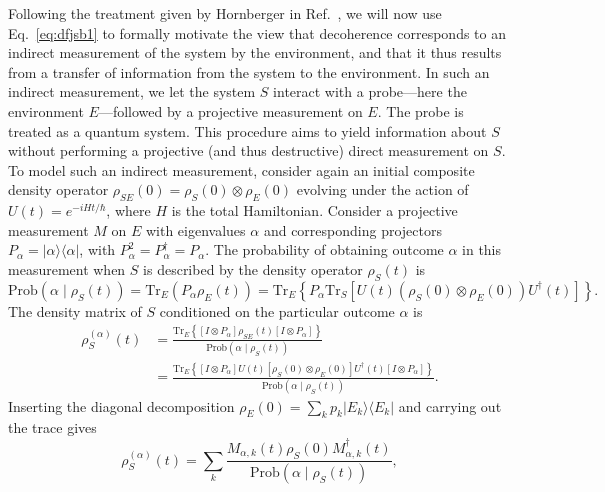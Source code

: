 \documentclass[3p,sort&compress,12pt]{elsarticle}
\newcommand{\ketbra}[2]{\ensuremath{|{#1 \rangle}{\langle #2}|}}
\newcommand{\E}{\ensuremath{e}}
\newcommand{\I}{\ensuremath{i}}
\newcommand{\op}[1]{#1}
\begin{document}
Following the treatment given by Hornberger in Ref.~\cite{Hornberger:2009:aq}, we will now use Eq.~\eqref{eq:dfjsb1} to formally motivate the view that decoherence corresponds to an indirect measurement of the system by the environment, and that it thus results from a transfer of information from the system to the environment. In such an indirect measurement, we let the system $S$ interact with a probe---here the environment $E$---followed by a projective measurement on $E$. The probe is treated as a quantum system. This procedure aims to yield information about $S$ without performing a projective (and thus destructive) direct measurement on $S$. To model such an indirect measurement, consider again an initial composite density operator $\op{\rho}_{SE}(0) = \op{\rho}_S(0) \otimes \op{\rho}_E(0)$ evolving under the action of $U(t) = \E^{-\I H t/\hbar}$, where $H$ is the total Hamiltonian. Consider a projective measurement $M$ on $E$ with eigenvalues $\alpha$ and corresponding projectors $P_\alpha = \ketbra{\alpha}{\alpha}$, with $P_\alpha^2=P_\alpha^\dagger=P_\alpha$. The probability of obtaining outcome $\alpha$ in this measurement when $S$ is described by the density operator $\op{\rho}_S(t)$ is
%
\begin{equation}
 \text{Prob}\left(\alpha \mid \op{\rho}_S(t) \right) = \text{Tr}_E \left( P_\alpha \op{\rho}_E(t) \right) = \text{Tr}_E \left\{ P_\alpha \text{Tr}_S \left[ U(t) \left( \op{\rho}_S(0) \otimes \op{\rho}_E(0) \right) U^\dagger(t)\right] \right\}.
\end{equation}
%
The density matrix of $S$ conditioned on the particular outcome $\alpha$ is
%
\begin{align}
\op{\rho}_S^{(\alpha)}(t) &= 
\frac{ \text{Tr}_E \left\{ \left[I \otimes P_\alpha \right] \op{\rho}_{SE}(t) \left[I \otimes P_\alpha \right] \right\}}{\text{Prob}\left(\alpha \mid \op{\rho}_S(t)\right)}\nonumber\\
&=\frac{ \text{Tr}_E \left\{ \left[I \otimes P_\alpha \right] U(t) \left[ \op{\rho}_S(0) \otimes \op{\rho}_E(0) \right] U^\dagger(t)  \left[I \otimes P_\alpha \right] \right\}}{\text{Prob}\left(\alpha \mid \op{\rho}_S(t)\right)}.\label{eq:hiuvb}
\end{align}
%
Inserting the diagonal decomposition $\op{\rho}_E(0) = \sum_k p_k \ketbra{E_k}{E_k}$ and carrying out the trace gives \cite{Hornberger:2009:aq}
%
\begin{equation}\label{eq:hiuvbxxxxx}
\op{\rho}_S^{(\alpha)}(t) = \sum_k \frac{ M_{\alpha,k}(t)  \op{\rho}_S(0) M^\dagger_{\alpha,k}(t)}{\text{Prob}\left(\alpha \mid \op{\rho}_S(t)\right)},
\end{equation}
\end{document}

